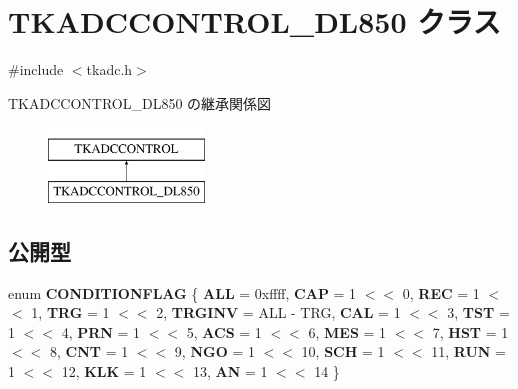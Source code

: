 \hypertarget{class_t_k_a_d_c_c_o_n_t_r_o_l___d_l850}{}\section{T\+K\+A\+D\+C\+C\+O\+N\+T\+R\+O\+L\+\_\+\+D\+L850 クラス}
\label{class_t_k_a_d_c_c_o_n_t_r_o_l___d_l850}


{\ttfamily \#include $<$tkadc.\+h$>$}

T\+K\+A\+D\+C\+C\+O\+N\+T\+R\+O\+L\+\_\+\+D\+L850 の継承関係図\begin{figure}[H]
\begin{center}
\leavevmode
\includegraphics[height=2.000000cm]{class_t_k_a_d_c_c_o_n_t_r_o_l___d_l850}
\end{center}
\end{figure}
\subsection*{公開型}
\begin{DoxyCompactItemize}
\item 
\mbox{\label{class_t_k_a_d_c_c_o_n_t_r_o_l___d_l850_aecf0f8f87a3fd72a24a12d859eefd456}} 
enum {\bfseries C\+O\+N\+D\+I\+T\+I\+O\+N\+F\+L\+AG} \{ \newline
{\bfseries A\+LL} = 0xffff, 
{\bfseries C\+AP} = 1 $<$$<$ 0, 
{\bfseries R\+EC} = 1 $<$$<$ 1, 
{\bfseries T\+RG} = 1 $<$$<$ 2, 
\newline
{\bfseries T\+R\+G\+I\+NV} = A\+LL -\/ T\+RG, 
{\bfseries C\+AL} = 1 $<$$<$ 3, 
{\bfseries T\+ST} = 1 $<$$<$ 4, 
{\bfseries P\+RN} = 1 $<$$<$ 5, 
\newline
{\bfseries A\+CS} = 1 $<$$<$ 6, 
{\bfseries M\+ES} = 1 $<$$<$ 7, 
{\bfseries H\+ST} = 1 $<$$<$ 8, 
{\bfseries C\+NT} = 1 $<$$<$ 9, 
\newline
{\bfseries N\+GO} = 1 $<$$<$ 10, 
{\bfseries S\+CH} = 1 $<$$<$ 11, 
{\bfseries R\+UN} = 1 $<$$<$ 12, 
{\bfseries K\+LK} = 1 $<$$<$ 13, 
\newline
{\bfseries AN} = 1 $<$$<$ 14
 \}
\end{DoxyCompactItemize}
